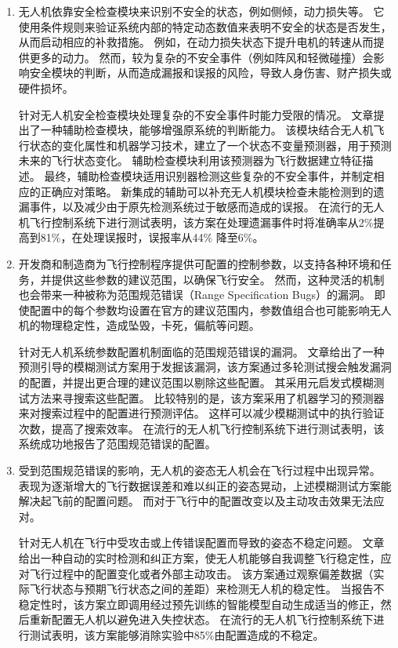 \begin{enumerate}
    \item %
    无人机依靠安全检查模块来识别不安全的状态，例如侧倾，动力损失等。
    它使用条件规则来验证系统内部的特定动态数值来表明不安全的状态是否发生，从而启动相应的补救措施。
    例如，在动力损失状态下提升电机的转速从而提供更多的动力。
    然而，较为复杂的不安全事件（例如阵风和轻微碰撞）会影响安全模块的判断，从而造成漏报和误报的风险，导致人身伤害、财产损失或硬件损坏。
    
    针对无人机安全检查模块处理复杂的不安全事件时能力受限的情况。
    文章提出了一种辅助检查模块，能够增强原系统的判断能力。
    该模块结合无人机飞行状态的变化属性和机器学习技术，建立了一个状态不变量预测器，用于预测未来的飞行状态变化。
    辅助检查模块利用该预测器为飞行数据建立特征描述。
    最终，辅助检查模块适用识别器检测这些复杂的不安全事件，并制定相应的正确应对策略。
    新集成的辅助可以补充无人机模块检查未能检测到的遗漏事件，以及减少由于原先检测系统过于敏感而造成的误报。
    在流行的无人机飞行控制系统下进行测试表明，该方案在处理遗漏事件时将准确率从2\%提高到81\%，在处理误报时，误报率从44\% 降至6\%。

    \item %
    开发商和制造商为飞行控制程序提供可配置的控制参数，以支持各种环境和任务，并提供这些参数的建议范围，以确保飞行安全。
    然而，这种灵活的机制也会带来一种被称为范围规范错误（Range Specification Bugs）的漏洞。
    即使配置中的每个参数均设置在官方的建议范围内，参数值组合也可能影响无人机的物理稳定性，造成坠毁，卡死，偏航等问题。
    
    针对无人机系统参数配置机制面临的范围规范错误的漏洞。
    文章给出了一种预测引导的模糊测试方案用于发掘该漏洞，该方案通过多轮测试搜会触发漏洞的配置，并提出更合理的建议范围以剔除这些配置。
    其采用元启发式模糊测试方法来寻搜索这些配置。
    比较特别的是，该方案采用了机器学习的预测器来对搜索过程中的配置进行预测评估。
    这样可以减少模糊测试中的执行验证次数，提高了搜索效率。
    在流行的无人机飞行控制系统下进行测试表明，该系统成功地报告了范围规范错误的配置。

    \item %
    受到范围规范错误的影响，无人机的姿态无人机会在飞行过程中出现异常。
    表现为逐渐增大的飞行数据误差和难以纠正的姿态晃动，上述模糊测试方案能解决起飞前的配置问题。
    而对于飞行中的配置改变以及主动攻击效果无法应对。
    
    针对无人机在飞行中受攻击或上传错误配置而导致的姿态不稳定问题。
    文章给出一种自动的实时检测和纠正方案，使无人机能够自我调整飞行稳定性，应对飞行过程中的配置变化或者外部主动攻击。
    该方案通过观察偏差数据（实际飞行状态与预期飞行状态之间的差距）来检测无人机的稳定性。
    当报告不稳定性时，该方案立即调用经过预先训练的智能模型自动生成适当的修正，然后重新配置无人机以避免进入失控状态。
    在流行的无人机飞行控制系统下进行测试表明，该方案能够消除实验中85\%由配置造成的不稳定。
    
\end{enumerate}




